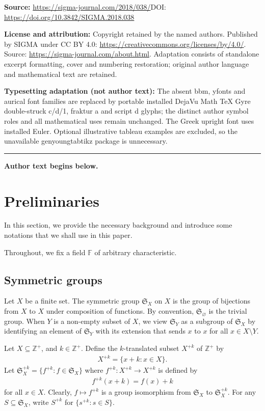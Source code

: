 \documentclass[11pt]{article}
\newcommand{\sym}[1]{\mathfrak{S}_{#1}}
\newcommand{\F}{\mathbb{F}}
\newcommand{\tl}[2]{{#1}^{+#2}} %
\newcommand{\tlsym}[2]{\mathfrak{S}_{#1}^{+#2}}
\begin{document}
\noindent\textbf{Source:} \url{https://sigma-journal.com/2018/038/}\quad DOI: \url{https://doi.org/10.3842/SIGMA.2018.038}\par
\noindent\textbf{License and attribution:} Copyright retained by the named authors. Published by SIGMA under CC BY 4.0: \url{https://creativecommons.org/licenses/by/4.0/}. Source: \url{https://sigma-journal.com/about.html}. Adaptation consists of standalone excerpt formatting, cover and numbering restoration; original author language and mathematical text are retained.\par
\noindent\textbf{Typesetting adaptation (not author text):} The absent bbm, yfonts and aurical font families are replaced by portable installed DejaVu Math TeX Gyre double-struck c/d/1, fraktur a and script d glyphs; the distinct author symbol roles and all mathematical uses remain unchanged. The Greek upright font uses installed Euler. Optional illustrative tableau examples are excluded, so the unavailable genyoungtabtikz package is unnecessary.\par
\medskip\hrule\medskip\noindent\textbf{Author text begins below.}\par
\setcounter{section}{1}
\setcounter{subsection}{0}
\setcounter{subsubsection}{0}
\setcounter{Theorem}{0}
\setcounter{equation}{0}
\section{Preliminaries}

In this section, we provide the necessary background and introduce some notations that we shall use in this paper.

Throughout, we fix a field $\F$ of arbitrary characteristic.

\subsection{Symmetric groups}

Let $X$ be a finite set. The symmetric group $\sym{X}$ on $X$ is the group of bijections from $X$ to $X$ under composition of functions. By convention, $\sym{\varnothing}$ is the trivial group. When $Y$ is a non-empty subset of $X$, we view $\sym{Y}$ as a subgroup of $\sym{X}$ by identifying an element of $\sym{Y}$ with its extension that sends $x$ to $x$ for all $x \in X \setminus Y$.

Let $X \subseteq \mathbb{Z}^+$, and $k \in \mathbb{Z}^+$. Define the $k$-translated subset $\tl{X}{k}$ of $\mathbb{Z}^+$ by
\begin{gather*}\tl{X}{k} = \{ x+ k\colon x \in X \}. \end{gather*}
Let $\tlsym{X}{k}=\big\{\tl{f}{k}\colon f\in\sym{X}\big\}$ where $\tl{f}{k}\colon \tl{X}{k}\to\tl{X}{k}$ is defined by
\begin{gather*}
\tl{f}{k}(x+k) = f(x) + k
\end{gather*}
for all $x \in X$. Clearly, $f \mapsto \tl{f}{k}$ is a group isomorphism from $\sym{X}$ to $\tlsym{X}{k}$. For any $S \subseteq \sym{X}$, write $\tl{S}{k}$ for $\{ \tl{s}{k}\colon s \in S\}$.
\end{document}
